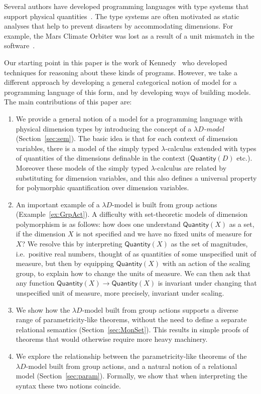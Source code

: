 \documentclass[a4paper,UKenglish]{lipics}
\theoremstyle{plain}
\newcommand{\msf}[1]{\mathsf{#1}} %
\newcommand{\qnt}{\msf{Quantity}}
\newcommand{\Dvar}{X}
\begin{document}
 Several authors have developed programming languages with type systems that support physical quantities~\cite{house1983proposal, manner1986strong, wand1991automatic, Kennedy:1997:RPU:263699.263761, erwig2002adding}. The type systems are often motivated as static analyses that help to prevent disasters by accommodating dimensions. For example, the Mars Climate Orbiter was lost as a result of a unit mismatch in the software~\cite{MarsCrash}.

Our starting point in this paper is the work of Kennedy~\cite{Kennedy:1997:RPU:263699.263761} who developed techniques for reasoning about these kinds of programs. However, we take a different approach by developing a general categorical notion of model for a programming language of this form, and by developing ways of building models. The main contributions of this paper are:
\begin{enumerate}
\item We provide a general notion of a model for a programming language with physical dimension types by introducing the concept of a \emph{$\lambda D$-model} (Section~\ref{sec:sem}). The basic idea is that for each context of dimension variables, there is a model of the simply typed $\lambda$-calculus extended with types of quantities of the dimensions definable in the context ($\qnt(D)$ etc.). Moreover these models of the simply typed $\lambda$-calculus are related by substituting for dimension variables, and this also defines a universal property for polymorphic quantification over dimension variables.

\item An important example of a $\lambda D$-model is built from group actions (Example~\ref{ex:GrpAct}).
A difficulty with set-theoretic models of dimension polymorphism is as follows: how does one understand $\qnt(\Dvar)$ as a set, if the dimension $\Dvar$ is not specified and we have no fixed units of measure for $\Dvar$? We resolve this by interpreting $\qnt(\Dvar)$ as the set of magnitudes, i.e.~positive real numbers, thought of as quantities of some unspecified unit of measure, but then by equipping $\qnt(\Dvar)$ with an action of the scaling group, to explain how to change the units of measure. We can then ask that any function $\qnt(\Dvar)\to\qnt(\Dvar)$ is invariant under changing that unspecified unit of measure, more precisely, invariant under scaling.

\item We show how the $\lambda D$-model built from group actions supports a diverse range of parametricity-like theorems, without the need to define a separate relational semantics (Section~\ref{sec:MonSet}). This results in simple proofs of theorems that would otherwise require more heavy machinery.

\item We explore the relationship between the parametricity-like theorems of the $\lambda D$-model built from group actions, and a natural notion of a relational model (Section~\ref{sec:param}). Formally, we show that when interpreting the syntax these two notions coincide.
\end{enumerate}
\end{document}
